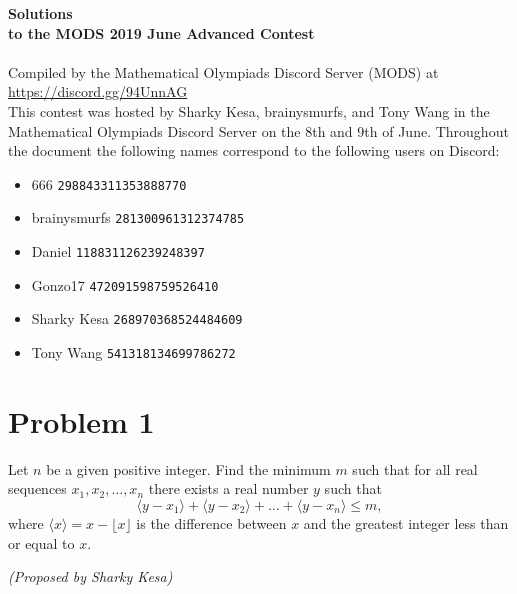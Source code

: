 \documentclass[10pt]{article}
\begin{document}
		\setcounter{section}{0}
		\noindent \huge\textbf{Solutions}\vspace{2pt}\\
		\noindent \large\textbf{to the MODS 2019 June Advanced Contest} \vspace{3pt}\\
		\noindent \makebox[\linewidth]{\rule{\textwidth}{0.4pt}}\\
	
		\noindent \normalsize Compiled by the Mathematical Olympiads Discord Server (MODS) at \url{https://discord.gg/94UnnAG}\\
		
		\noindent This contest was hosted by Sharky Kesa, brainysmurfs, and Tony Wang in the Mathematical Olympiads Discord Server on the 8th and 9th of June. Throughout the document the following names correspond to the following users on Discord:
		\begin{itemize}[noitemsep]
		\item 666 \tabto*{80pt}\texttt{298843311353888770}
		\item brainysmurfs \tabto*{80pt}\texttt{281300961312374785}
		\item Daniel \tabto*{80pt}\texttt{118831126239248397}
		\item Gonzo17 \tabto*{80pt}\texttt{472091598759526410}
		\item Sharky Kesa \tabto*{80pt}\texttt{268970368524484609}
		\item Tony Wang \tabto*{80pt}\texttt{541318134699786272}
		\end{itemize}
		
		
	\newpage		
			
	\section*{Problem 1}
	
	Let \(n\) be a given positive integer. Find the minimum \(m\) such that for all real sequences \(x_1, x_2, \dots, x_n\) there exists a real number \(y\) such that \[\langle y - x_1 \rangle + \langle y - x_2 \rangle + \dots + \langle y - x_n \rangle \leq m,\] where \(\langle x \rangle = x - \lfloor x \rfloor\) is the difference between \(x\) and the greatest integer less than or equal to \(x\).
	\begin{flushright}
	\textit{(Proposed by Sharky Kesa)}
	\end{flushright}
	
		{\centering \noindent \makebox[\linewidth]{\rule{\textwidth}{0.4pt}}}
	
\end{document}
